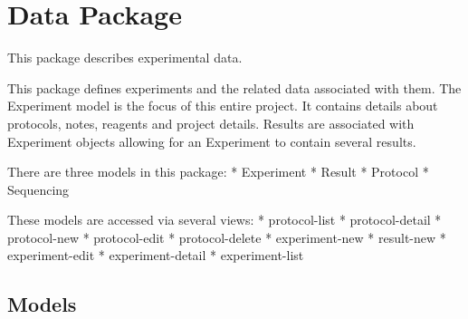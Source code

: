 \documentclass[letterpaper,10pt,english]{sphinxmanual}
\begin{document}
\section{Data Package}
\label{api:module-experimentdb.data}\label{api:data-package}
This package describes experimental data.


This package defines experiments and the related data associated with them.  The Experiment model is the focus of this entire project.  It contains details about protocols, notes, reagents and project details.  Results are associated with Experiment objects allowing for an Experiment to contain several results.


There are three models in this package:
* Experiment
* Result
* Protocol
* Sequencing


These models are accessed via several views:
* protocol-list
* protocol-detail
* protocol-new
* protocol-edit
* protocol-delete
* experiment-new
* result-new
* experiment-edit
* experiment-detail
* experiment-list



\subsection{Models}
\label{api:models}\label{api:module-experimentdb.data.models}
\end{document}
